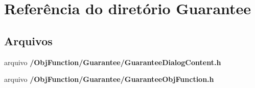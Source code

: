 \section{Referência do diretório Guarantee}
\label{dir_c58b413f069d59a63b25e50a554dbb38}
\subsection*{Arquivos}
\begin{DoxyCompactItemize}
\item 
arquivo {\bf /\+Obj\+Function/\+Guarantee/\+Guarantee\+Dialog\+Content.\+h}
\item 
arquivo {\bf /\+Obj\+Function/\+Guarantee/\+Guarantee\+Obj\+Function.\+h}
\end{DoxyCompactItemize}
